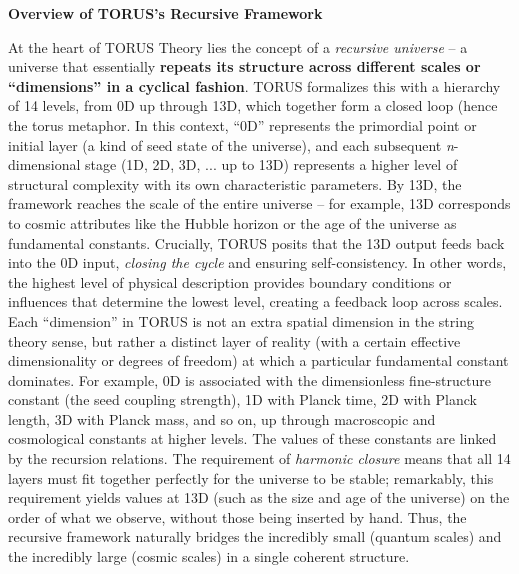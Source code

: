 \documentclass[
]{article}
\begin{document}
\textbf{Overview of TORUS's Recursive Framework}

At the heart of TORUS Theory lies the concept of a \emph{recursive
universe} -- a universe that essentially \textbf{repeats its structure
across different scales or ``dimensions'' in a cyclical fashion}. TORUS
formalizes this with a hierarchy of 14 levels, from 0D up through 13D,
which together form a closed loop (hence the torus metaphor. In this
context, ``0D'' represents the primordial point or initial layer (a kind
of seed state of the universe), and each subsequent \emph{n}-dimensional
stage (1D, 2D, 3D, ... up to 13D) represents a higher level of
structural complexity with its own characteristic parameters. By 13D,
the framework reaches the scale of the entire universe -- for example,
13D corresponds to cosmic attributes like the Hubble horizon or the age
of the universe as fundamental constants\hspace{0pt}. Crucially, TORUS
posits that the 13D output feeds back into the 0D input, \emph{closing
the cycle} and ensuring self-consistency\hspace{0pt}. In other words,
the highest level of physical description provides boundary conditions
or influences that determine the lowest level, creating a feedback loop
across scales. Each ``dimension'' in TORUS is not an extra spatial
dimension in the string theory sense, but rather a distinct layer of
reality (with a certain effective dimensionality or degrees of freedom)
at which a particular fundamental constant dominates. For example, 0D is
associated with the dimensionless fine-structure constant \alpha (the seed
coupling strength), 1D with Planck time, 2D with Planck length, 3D with
Planck mass, and so on, up through macroscopic and cosmological
constants at higher levels\hspace{0pt}. The values of these constants
are linked by the recursion relations. The requirement of \emph{harmonic
closure} means that all 14 layers must fit together perfectly for the
universe to be stable; remarkably, this requirement yields values at 13D
(such as the size and age of the universe) on the order of what we
observe, without those being inserted by hand\hspace{0pt}. Thus, the
recursive framework naturally bridges the incredibly small (quantum
scales) and the incredibly large (cosmic scales) in a single coherent
structure.
\end{document}
